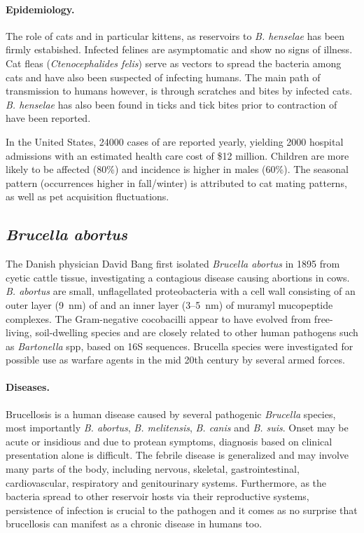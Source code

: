 \paragraph{Epidemiology.}
The role of cats and in particular kittens, as reservoirs to \textit{B. henselae} has been firmly estabished. Infected felines are asymptomatic and show no signs of illness. Cat fleas (\textit{Ctenocephalides felis}) serve as vectors to spread the bacteria among cats and have also been suspected of infecting humans. The main path of transmission to humans however, is through scratches and bites by infected cats. \textit{B. henselae} has also been found in ticks and tick bites prior to contraction of  have been reported.

In the United States, 24000 cases of  are reported yearly, yielding 2000 hospital admissions with an estimated health care cost of \$12 million. Children are more likely to be affected (80\%) and incidence is higher in males (60\%). The seasonal pattern (occurrences higher in fall\slash winter) is attributed to cat mating patterns, as well as pet acquisition fluctuations.

\subsection{\textit{Brucella abortus}}

The Danish physician David Bang first isolated \textit{Brucella abortus} in 1895 from cyetic cattle tissue, investigating a contagious disease causing abortions in cows. \textit{B. abortus} are small, unflagellated proteobacteria with a cell wall consisting of an outer layer (\SI{9}{\nano\meter}) of  and an inner layer (3--\SI{5}{\nano\meter}) of muramyl mucopeptide complexes. The Gram-negative cocobacilli appear to have evolved from free-living, soil-dwelling species and are closely related to other human pathogens such as \textit{Bartonella} \acrshort{spp}, based on 16S  sequences. Brucella species were investigated for possible use as warfare agents in the mid 20th century by several armed forces. \citep{Atluri2011,VonBargen2012}

\paragraph{Diseases.}
Brucellosis is a human disease caused by several pathogenic \textit{Brucella} species, most importantly \textit{B. abortus}, \textit{B. melitensis}, \textit{B. canis} and \textit{B. suis}. Onset may be acute or insidious and due to protean symptoms, diagnosis based on clinical presentation alone is difficult. The febrile disease is generalized and may involve many parts of the body, including nervous, skeletal, gastrointestinal, cardiovascular, respiratory and genitourinary systems. Furthermore, as the bacteria spread to other reservoir hosts via their reproductive systems, persistence of infection is crucial to the pathogen and it comes as no surprise that brucellosis can manifest as a chronic disease in humans too.

